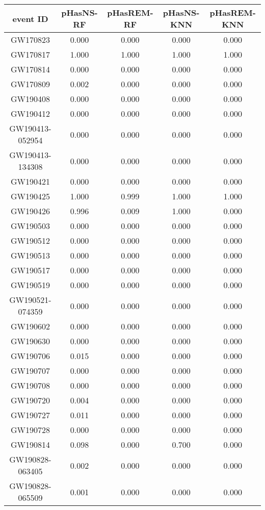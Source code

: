 \begin{table}[]
\centering
\begin{tabular}{ccccc}
\hline
event ID & pHasNS-RF & pHasREM-RF & pHasNS-KNN & pHasREM-KNN \\
\hline 
\hline
GW170823 &	0.000 &	0.000 & 0.000 &	0.000 \\
GW170817 &	1.000 &	1.000 & 1.000 & 1.000 \\
GW170814 &	0.000 &	0.000 & 0.000 & 0.000 \\
GW170809 &	0.002 & 0.000 & 0.000 & 0.000 \\
GW190408 &	0.000 &	0.000 & 0.000 & 0.000 \\
GW190412 &	0.000 &	0.000 & 0.000 & 0.000 \\
GW190413-052954 & 0.000  & 0.000 & 0.000 & 0.000 \\
GW190413-134308 & 0.000 &	0.000 & 0.000 & 0.000 \\
GW190421 &	0.000 &	0.000 & 0.000 & 0.000 \\
GW190425 &	1.000 &	0.999 & 1.000 & 1.000 \\
GW190426 &	0.996 & 0.009 & 1.000 & 0.000 \\
GW190503 &	0.000 &	0.000 & 0.000 & 0.000 \\
GW190512 &  0.000 &	0.000 & 0.000 & 0.000 \\
GW190513 &	0.000 &	0.000 & 0.000 & 0.000 \\
GW190517 &	0.000 &	0.000 & 0.000 & 0.000 \\
GW190519 &	0.000 &	0.000 & 0.000 & 0.000 \\
GW190521-074359  &	0.000 &	0.000 & 0.000 & 0.000 \\
GW190602 &	0.000 &	0.000 & 0.000 & 0.000 \\
GW190630 &	0.000 &	0.000 & 0.000 & 0.000 \\
GW190706 & 0.015 &	0.000 &	0.000 &	0.000 \\ 
GW190707 & 0.000 & 0.000 &	0.000 &	0.000 \\
GW190708 & 0.000 &	0.000 &	0.000 &	0.000 \\
GW190720 & 0.004 &	0.000 &	0.000 &	0.000 \\
GW190727 & 0.011 &	0.000 &	0.000 &	0.000 \\
GW190728 & 0.000 &	0.000 &	0.000 &	0.000 \\
GW190814 & 0.098 &	0.000 &	0.700 &	0.000 \\
GW190828-063405 & 0.002 &	0.000 &	0.000 & 0.000 \\
GW190828-065509 &  0.001 &	0.000 &	0.000 &	0.000 \\

\end{tabular}
\end{table}
